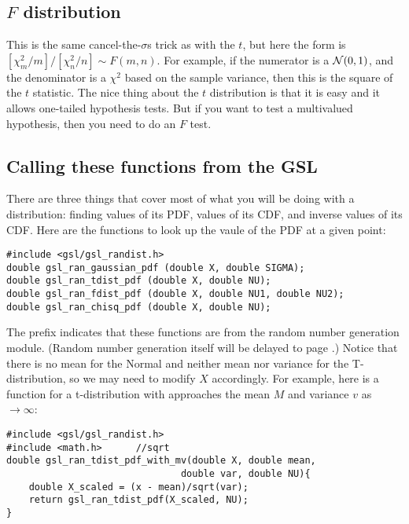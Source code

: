 \subsection{$F$ distribution}  This is the same cancel-the-$\sigma$s trick as with the $t$, but here the form
is $[\chi^2_m/m]/[\chi^2_n/n]\sim F(m,n)$. For example, if the numerator
is a ${\cal N}(0,1)$, and the denominator is a $\chi^2$ based on the
sample variance, then this is the square of the $t$ statistic.
The nice thing about the $t$ distribution is that it is easy and it
allows one-tailed hypothesis tests. But if you want to test a
multivalued hypothesis, then you need to do an $F$ test.

\subsection{Calling these functions from the GSL}
There are three things that cover most of what you will be doing with a
distribution: finding values of its PDF, values of its CDF, and inverse
values of its CDF.
Here are the functions to look up the vaule of the PDF at a given point:
\begin{lstlisting}
#include <gsl/gsl_randist.h>
double gsl_ran_gaussian_pdf (double X, double SIGMA);
double gsl_ran_tdist_pdf (double X, double NU);
double gsl_ran_fdist_pdf (double X, double NU1, double NU2);
double gsl_ran_chisq_pdf (double X, double NU);
\end{lstlisting}
The prefix  indicates that these functions are from the
random number generation module. (Random number generation itself will be delayed to page
\pageref{randomnumbers}.) Notice that there is no mean for the Normal and neither mean nor variance
for the T-distribution, so we may need to modify $X$ accordingly. For
example, here is a function for a t-distribution with approaches the
mean $M$ and variance $v$ as $\to \infty$:
\begin{lstlisting}
#include <gsl/gsl_randist.h>
#include <math.h>      //sqrt
double gsl_ran_tdist_pdf_with_mv(double X, double mean,
                               double var, double NU){
    double X_scaled = (x - mean)/sqrt(var);
    return gsl_ran_tdist_pdf(X_scaled, NU);
}
\end{lstlisting}


